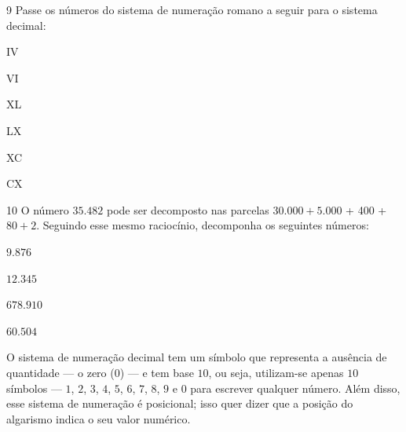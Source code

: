 
\num{9}  Passe os números do sistema de numeração romano a seguir para o
sistema decimal:

\begin{escolha}
\item IV 
\item VI 
\item XL 
\item LX 
\item XC 
\item CX 
\end{escolha}

\num{10}  O número $35.482$ pode ser decomposto nas parcelas $30.000 + 5.000$ +
400 + $80 + 2$. Seguindo esse mesmo raciocínio, decomponha os seguintes
números:

\begin{escolha}
\item $9.876$ 
\item $12.345$ 
\item $678.910$ 
\item $60.504$ 
\end{escolha}

\noindent O sistema de numeração decimal tem um símbolo
que representa a ausência de quantidade — o zero ($0$) — e tem base $10$,
ou seja, utilizam-se apenas $10$ símbolos — $1$, $2$, $3$, $4$, $5$, $6$, $7$, $8$, $9$ e $0$ para escrever qualquer número. Além disso, esse sistema de numeração é
posicional; isso quer dizer que a posição do algarismo indica o seu
valor numérico.

